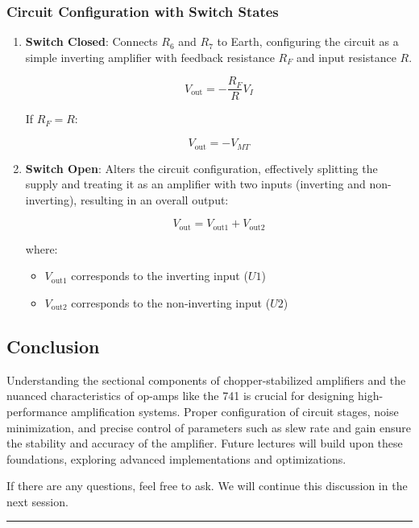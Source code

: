 \documentclass[a4paper,9pt,twoside,openany,twocolumn]{memoir}
\begin{document}
\subsubsection{Circuit Configuration with Switch States}

\begin{enumerate}
    \item \textbf{Switch Closed}: Connects \( R_6 \) and \( R_7 \) to Earth, configuring the circuit as a simple inverting amplifier with feedback resistance \( R_F \) and input resistance \( R \).
    
    \[
    V_{\text{out}} = -\frac{R_F}{R} V_I
    \]
    
    If \( R_F = R \):
    
    \[
    V_{\text{out}} = -V_{MT}
    \]
    
    \item \textbf{Switch Open}: Alters the circuit configuration, effectively splitting the supply and treating it as an amplifier with two inputs (inverting and non-inverting), resulting in an overall output:
    
    \[
    V_{\text{out}} = V_{\text{out1}} + V_{\text{out2}}
    \]
    
    where:
    \begin{itemize}
        \item \( V_{\text{out1}} \) corresponds to the inverting input (\( U1 \))
        \item \( V_{\text{out2}} \) corresponds to the non-inverting input (\( U2 \))
    \end{itemize}
\end{enumerate}

\subsection{Conclusion}

Understanding the sectional components of chopper-stabilized amplifiers and the nuanced characteristics of op-amps like the 741 is crucial for designing high-performance amplification systems. Proper configuration of circuit stages, noise minimization, and precise control of parameters such as slew rate and gain ensure the stability and accuracy of the amplifier. Future lectures will build upon these foundations, exploring advanced implementations and optimizations.

If there are any questions, feel free to ask. We will continue this discussion in the next session.
\begin{center}\rule{0.5\linewidth}{0.5pt}\end{center}
\end{document}
